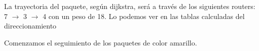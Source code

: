\documentclass[12pt]{article} %
\begin{document}
La trayectoria del paquete, según dijkstra, será a través de los siguientes routers: 7 $\rightarrow$ 3 $\rightarrow$ 4 con un peso de 18. Lo podemos ver en las tablas calculadas del direccionamiento

\begin{figure}[H] %
\label{fig:config_1_C_D_y_E}
\end{figure}

\begin{figure}[H] %
\label{fig:config_1_C_D_y_E_2}
\end{figure}

Comenzamos el seguimiento de los paquetes de color amarillo.

\begin{figure}[H] %
\label{fig:config_1_run1}
\end{figure}
\end{document}

